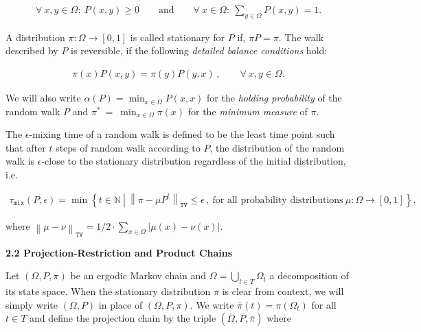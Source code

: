 \documentclass[10pt,a4paper]{article}
\begin{document}
\[\begin{gathered}
\forall~x,y\in\Omega:~P(x,y)\geq 0\qquad\textrm{and}\qquad\forall~x\in\Omega:~\sum_{y\in\Omega}P(x,y)=1.
\end{gathered}\]


A distribution $\pi:\Omega\to[0,1]$ is called stationary for $P$ if, $\pi P=\pi$. The walk described by $P$ is reversible, if the following \emph{detailed balance conditions} hold:\par


\[\begin{gathered}
\pi(x)P(x,y)=\pi(y)P(y,x)\,,\quad\quad\forall~x,y\in\Omega.
\end{gathered}\]


We will also write $\alpha(P)=\min_{x\in\Omega}P(x,x)$ for the \emph{holding probability} of the random walk $P$ and $\pi^{*}~=~\min_{x\in\Omega}\pi(x)$ for the \emph{minimum measure} of $\pi$.\par




The $\epsilon$-mixing time of a random walk is defined to be the least time point such that after $t$ steps of random walk according to $P$, the distribution of the random walk is $\epsilon$-close to the stationary distribution regardless of the initial distribution, i.e.\par


\[\begin{gathered}
\tau_{\mathtt{mix}}(P,\epsilon)=\min\left\{t\in\mathbb{N}~\left|~\left\|\pi-\mu P^{t}\right\|_{\mathtt{TV}}\leq\epsilon\,,~\textrm{for all probability distributions}~\mu:\Omega\to[0,1]\right.\right\},
\end{gathered}\]


where $\left\|\mu-\nu\right\|_{\mathtt{TV}}=1/2\cdot\sum_{x\in\Omega}|\mu(x)-\nu(x)|$.\par





\par\medskip\noindent\textbf{2.2 Projection-Restriction and Product Chains}\par




Let $(\Omega,P,\pi)$ be an ergodic Markov chain and $\Omega=\bigcup_{t\in T}\Omega_{t}$ a decomposition of its state space. When the stationary distribution $\pi$ is clear from context, we will simply write $(\Omega,P)$ in place of $(\Omega,P,\pi)$. We write $\bar{\pi}(t)=\pi(\Omega_{t})$ for all $t\in T$ and define the projection chain by the triple $(\overline{\Omega},\overline{P},\bar{\pi})$ where\par
\end{document}
